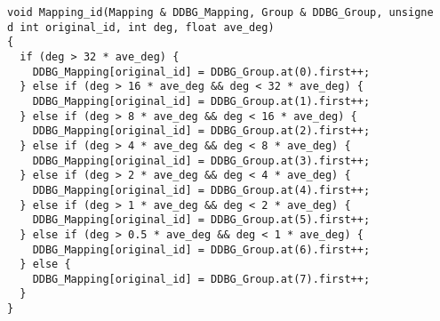\begin{comment}
\begin{lstlisting}
void DBGEE(Graph & Partial_Graph, Graph & Mapped_Graph, Group & DBGEE_Group, Mapping & DBGEE_Mapping)
{
  unsigned int edge_num = 0;
  for (auto & [src, dsts] : Partial_Graph){
    edge_num += dsts.size();
  }
  float ave_deg = static_cast<float>(edge_num)/Partial_Graph.size();

  vector<unsigned int> v_sorted;
  for (auto & [src, dsts] : Partial_Graph){
    v_sorted.push_back(src);
  }
  sort(v_sorted.begin(), v_sorted.end());

  unsigned int mapped_src, mapped_dst;
  for (auto [src, dsts] : Partial_Graph) {
    if (DDBG_Mapping.count(src) == 0) {
      Mapping_id(DDBG_Mapping, DDBG_Group, src, dsts.size(), ave_de
g);
].size(), counter, ave_deg);
    }
    mapped_src = DDBG_Mapping[src];
    for (auto & dst : dsts) {
      if (DDBG_Mapping.count(dst) == 0) {
        Mapping_id(DDBG_Mapping, DDBG_Group, dst, Partial_Graph[dst
].size(), ave_deg);
st].size(), counter, ave_deg);
      }
      mapped_dst = DDBG_Mapping[dst];
      if (find(Mapped_Graph[mapped_src].begin(), Mapped_Graph[mappe
d_src].end(), mapped_dst) == Mapped_Graph[mapped_src].end()) {
        Mapped_Graph[mapped_src].push_back(mapped_dst);
      }
    }
  }
  Partial_Graph.clear();
}
\end{lstlisting}
\end{comment}

\begin{lstlisting}
void Mapping_id(Mapping & DDBG_Mapping, Group & DDBG_Group, unsigne
d int original_id, int deg, float ave_deg)
{
  if (deg > 32 * ave_deg) {
    DDBG_Mapping[original_id] = DDBG_Group.at(0).first++;
  } else if (deg > 16 * ave_deg && deg < 32 * ave_deg) {
    DDBG_Mapping[original_id] = DDBG_Group.at(1).first++;
  } else if (deg > 8 * ave_deg && deg < 16 * ave_deg) {
    DDBG_Mapping[original_id] = DDBG_Group.at(2).first++;
  } else if (deg > 4 * ave_deg && deg < 8 * ave_deg) {
    DDBG_Mapping[original_id] = DDBG_Group.at(3).first++;
  } else if (deg > 2 * ave_deg && deg < 4 * ave_deg) {
    DDBG_Mapping[original_id] = DDBG_Group.at(4).first++;
  } else if (deg > 1 * ave_deg && deg < 2 * ave_deg) {
    DDBG_Mapping[original_id] = DDBG_Group.at(5).first++;
  } else if (deg > 0.5 * ave_deg && deg < 1 * ave_deg) {
    DDBG_Mapping[original_id] = DDBG_Group.at(6).first++;
  } else {
    DDBG_Mapping[original_id] = DDBG_Group.at(7).first++;
  }
}
\end{lstlisting}